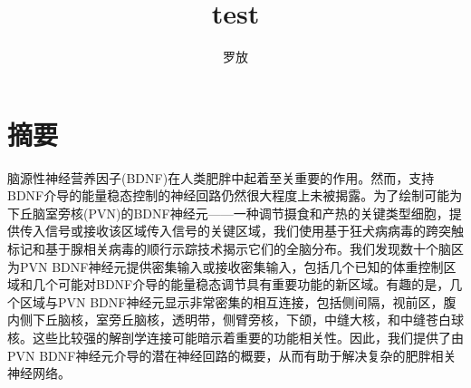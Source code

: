 \confidential{}%
\title{test}%
\author{罗\quad 放}%

\advisorsec{}%


\maketitle%
\makeenglishtitle%
\makedeclaration%
\chapter*{摘\quad 要}%
\setcounter{page}{1}%

脑源性神经营养因子(BDNF)在人类肥胖中起着至关重要的作用。然而，支持BDNF介导的能量稳态控制的神经回路仍然很大程度上未被揭露。为了绘制可能为下丘脑室旁核(PVN)的BDNF神经元------一种调节摄食和产热的关键类型细胞，提供传入信号或接收该区域传入信号的关键区域，我们使用基于狂犬病病毒的跨突触标记和基于腺相关病毒的顺行示踪技术揭示它们的全脑分布。我们发现数十个脑区为PVN BDNF神经元提供密集输入或接收密集输入，包括几个已知的体重控制区域和几个可能对BDNF介导的能量稳态调节具有重要功能的新区域。有趣的是，几个区域与PVN BDNF神经元显示非常密集的相互连接，包括侧间隔，视前区，腹内侧下丘脑核，室旁丘脑核，透明带，侧臂旁核，下颌，中缝大核，和中缝苍白球核。这些比较强的解剖学连接可能暗示着重要的功能相关性。因此，我们提供了由PVN BDNF神经元介导的潜在神经回路的概要，从而有助于解决复杂的肥胖相关神经网络。

